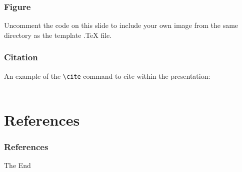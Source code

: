 \documentclass{beamer}
\begin{document}

\begin{frame}
\frametitle{Figure}
Uncomment the code on this slide to include your own image from the same directory as the template .TeX file.
\end{frame}


\begin{frame}[fragile] %
\frametitle{Citation}
An example of the \verb|\cite| command to cite within the presentation:\\~

\end{frame}




\section{References}


\begin{frame}
\frametitle{References}
\footnotesize{

}
\end{frame}


\begin{frame}
\Huge{\centerline{The End}}
\end{frame}

\end{document}
